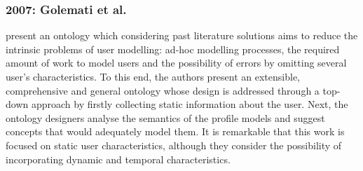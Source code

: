
\subsubsection{2007: Golemati et al.}
\label{sec:golemati2007creating}

\citet{golemati_creating_2007} present an ontology which considering past 
literature solutions aims to reduce the intrinsic problems of user modelling: 
ad-hoc modelling processes, the required amount of work to model users and the 
possibility of errors by omitting several user's characteristics. To this end,
the authors present an extensible, comprehensive and general ontology whose design
is addressed through a top-down approach by firstly collecting static information
about the user. Next, the ontology designers analyse the semantics of the profile
models and suggest concepts that would adequately model them. It is remarkable
that this work is focused on static user characteristics, although they consider 
the possibility of incorporating dynamic and temporal characteristics.




